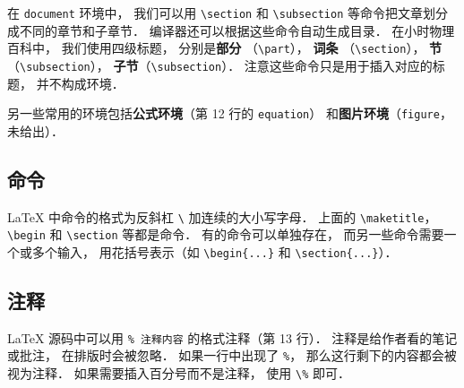 在 \verb|document| 环境中， 我们可以用 \verb|\section| 和 \verb|\subsection| 等命令把文章划分成不同的章节和子章节． 编译器还可以根据这些命令自动生成目录． 在小时物理百科中， 我们使用四级标题， 分别是\textbf{部分} （\verb|\part|）， \textbf{词条} （\verb|\section|）， \textbf{节}（\verb|\subsection|）， \textbf{子节}（\verb|\subsection|）． 注意这些命令只是用于插入对应的标题， 并不构成环境．

另一些常用的环境包括\textbf{公式环境}（第 12 行的 \verb|equation|） 和\textbf{图片环境}（\verb|figure|， 未给出）．

\subsection{命令}
LaTeX 中命令的格式为反斜杠 \verb|\| 加连续的大小写字母． 上面的 \verb|\maketitle|， \verb|\begin| 和 \verb|\section| 等都是命令． 有的命令可以单独存在， 而另一些命令需要一个或多个输入， 用花括号表示（如 \verb|\begin{...}| 和 \verb|\section{...}|）．

\subsection{注释}
LaTeX 源码中可以用 \verb|% 注释内容| 的格式注释（第 13 行）． 注释是给作者看的笔记或批注， 在排版时会被忽略． 如果一行中出现了 \verb|%|， 那么这行剩下的内容都会被视为注释． 如果需要插入百分号而不是注释， 使用 \verb|\%| 即可．

